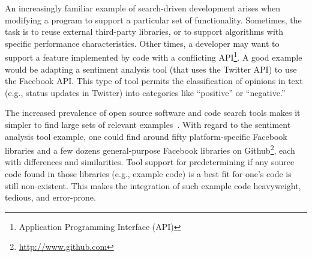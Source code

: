 An increasingly familiar example of search-driven development arises when modifying a program to support a particular set of functionality. Sometimes, the task is to reuse external third-party libraries, or to support algorithms with specific performance characteristics. Other times, a developer may want to support a feature implemented by code with a conflicting API\footnote{Application Programming Interface (API)}. A good example would be adapting a sentiment analysis tool (that uses the Twitter API) to use the Facebook API. This type of tool permits the classification of opinions in text (e.g., status updates in Twitter) into categories like ``positive'' or ``negative.'' 

The increased prevalence of open source software and code search tools makes it simpler to find large sets of relevant examples~\cite{Reiss:2009fu}. With regard to the sentiment analysis tool example, one could find around fifty platform-specific Facebook libraries and a few dozens general-purpose Facebook libraries on Github\footnote{\url{http://www.github.com}}, each with differences and similarities. Tool support for predetermining if any source code found in those libraries (e.g., example code) is a best fit for one's code is still non-existent. This makes the integration of such example code heavyweight, tedious, and error-prone. 


